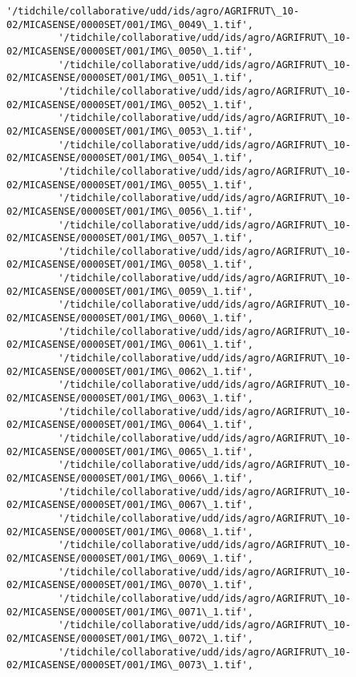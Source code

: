 \documentclass[11pt]{article}
\begin{document}
\begin{Verbatim}[commandchars=\\\{\}]
         '/tidchile/collaborative/udd/ids/agro/AGRIFRUT\_10-02/MICASENSE/0000SET/001/IMG\_0049\_1.tif',
         '/tidchile/collaborative/udd/ids/agro/AGRIFRUT\_10-02/MICASENSE/0000SET/001/IMG\_0050\_1.tif',
         '/tidchile/collaborative/udd/ids/agro/AGRIFRUT\_10-02/MICASENSE/0000SET/001/IMG\_0051\_1.tif',
         '/tidchile/collaborative/udd/ids/agro/AGRIFRUT\_10-02/MICASENSE/0000SET/001/IMG\_0052\_1.tif',
         '/tidchile/collaborative/udd/ids/agro/AGRIFRUT\_10-02/MICASENSE/0000SET/001/IMG\_0053\_1.tif',
         '/tidchile/collaborative/udd/ids/agro/AGRIFRUT\_10-02/MICASENSE/0000SET/001/IMG\_0054\_1.tif',
         '/tidchile/collaborative/udd/ids/agro/AGRIFRUT\_10-02/MICASENSE/0000SET/001/IMG\_0055\_1.tif',
         '/tidchile/collaborative/udd/ids/agro/AGRIFRUT\_10-02/MICASENSE/0000SET/001/IMG\_0056\_1.tif',
         '/tidchile/collaborative/udd/ids/agro/AGRIFRUT\_10-02/MICASENSE/0000SET/001/IMG\_0057\_1.tif',
         '/tidchile/collaborative/udd/ids/agro/AGRIFRUT\_10-02/MICASENSE/0000SET/001/IMG\_0058\_1.tif',
         '/tidchile/collaborative/udd/ids/agro/AGRIFRUT\_10-02/MICASENSE/0000SET/001/IMG\_0059\_1.tif',
         '/tidchile/collaborative/udd/ids/agro/AGRIFRUT\_10-02/MICASENSE/0000SET/001/IMG\_0060\_1.tif',
         '/tidchile/collaborative/udd/ids/agro/AGRIFRUT\_10-02/MICASENSE/0000SET/001/IMG\_0061\_1.tif',
         '/tidchile/collaborative/udd/ids/agro/AGRIFRUT\_10-02/MICASENSE/0000SET/001/IMG\_0062\_1.tif',
         '/tidchile/collaborative/udd/ids/agro/AGRIFRUT\_10-02/MICASENSE/0000SET/001/IMG\_0063\_1.tif',
         '/tidchile/collaborative/udd/ids/agro/AGRIFRUT\_10-02/MICASENSE/0000SET/001/IMG\_0064\_1.tif',
         '/tidchile/collaborative/udd/ids/agro/AGRIFRUT\_10-02/MICASENSE/0000SET/001/IMG\_0065\_1.tif',
         '/tidchile/collaborative/udd/ids/agro/AGRIFRUT\_10-02/MICASENSE/0000SET/001/IMG\_0066\_1.tif',
         '/tidchile/collaborative/udd/ids/agro/AGRIFRUT\_10-02/MICASENSE/0000SET/001/IMG\_0067\_1.tif',
         '/tidchile/collaborative/udd/ids/agro/AGRIFRUT\_10-02/MICASENSE/0000SET/001/IMG\_0068\_1.tif',
         '/tidchile/collaborative/udd/ids/agro/AGRIFRUT\_10-02/MICASENSE/0000SET/001/IMG\_0069\_1.tif',
         '/tidchile/collaborative/udd/ids/agro/AGRIFRUT\_10-02/MICASENSE/0000SET/001/IMG\_0070\_1.tif',
         '/tidchile/collaborative/udd/ids/agro/AGRIFRUT\_10-02/MICASENSE/0000SET/001/IMG\_0071\_1.tif',
         '/tidchile/collaborative/udd/ids/agro/AGRIFRUT\_10-02/MICASENSE/0000SET/001/IMG\_0072\_1.tif',
         '/tidchile/collaborative/udd/ids/agro/AGRIFRUT\_10-02/MICASENSE/0000SET/001/IMG\_0073\_1.tif',

\end{Verbatim}
\end{document}
